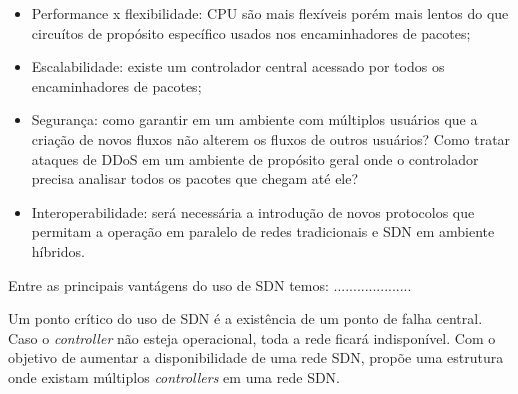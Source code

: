 \documentclass[12pt]{article}
\begin{document}
 \begin{itemize}
   \item Performance x flexibilidade:  CPU são mais flexíveis porém mais lentos do que circuítos de propósito específico usados nos encaminhadores de pacotes;
   \item Escalabilidade: existe um controlador central acessado por todos os encaminhadores de pacotes; 
   \item Segurança: como garantir em um ambiente com múltiplos usuários que a criação de novos fluxos não alterem os fluxos de outros usuários? Como tratar ataques de DDoS em um ambiente de propósito geral onde o controlador precisa analisar todos os pacotes que chegam até ele?
   \item Interoperabilidade: será necessária a introdução de novos protocolos que permitam a operação em paralelo de redes tradicionais e SDN em ambiente híbridos.
 \end{itemize}


Entre as principais vantágens do uso de SDN temos: ....................

Um ponto crítico do uso de SDN é a existência de um ponto de falha central. Caso o \textit{controller} não esteja operacional, toda a rede ficará indisponível. Com o objetivo de aumentar a disponibilidade de uma rede SDN, \cite{Dixit2013} propõe uma estrutura onde existam múltiplos \textit{controllers} em uma rede SDN.
\end{document}
